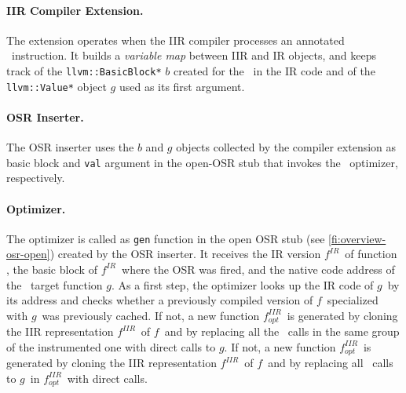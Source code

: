 \begin{enumerate}[noitemsep]
\begin{enumerate}
\paragraph{IIR Compiler Extension.}
The extension operates when the IIR compiler processes an annotated \feval\ instruction. It builds a {\em variable map} between IIR and IR objects, and keeps track of the {\tt llvm::BasicBlock*} $b$ created for the \feval\  in the IR code and of the {\tt llvm::Value*} object $g$ used as its first argument. 

\paragraph{OSR Inserter.}
The OSR inserter uses the $b$ and $g$ objects collected by the compiler extension as basic block and {\tt val} argument in the open-OSR stub that invokes the \feval\ optimizer, respectively.
\fi


\newcommand{\fBase}{$f$}
\newcommand{\fOpt}{$f_{opt}$}
\newcommand{\fIIR}{$f^{IIR}$}
\newcommand{\fIR}{$f^{IR}$}
\newcommand{\fOptIIR}{$f^{IIR}_{opt}$}
\newcommand{\fOptIR}{$f^{IR}_{opt}$}
\newcommand{\gTarget}{$g$}

\paragraph{Optimizer.}
The optimizer is called as {\tt gen} function in the open OSR stub (see \myfigure\ref{fi:overview-osr-open}) created by the OSR inserter. It receives the IR version \fIR\ of function \fbase, the basic block of \fIR\ where the OSR was fired, and the native code address of the \feval\ target function \gTarget. As a first step, the optimizer looks up the IR code of \gTarget\ by its address and checks whether a previously compiled version of \fBase\ specialized with \gTarget\ was previously cached.
\ifdefined \fullver
If not, a new function \fOptIIR\ is generated by cloning the IIR representation \fIIR\ of \fBase\ and by replacing all the \feval\ calls in the same group of the instrumented one with direct calls to \gTarget.
\else
If not, a new function \fOptIIR\ is generated by cloning the IIR representation \fIIR\ of \fBase\ and by replacing all \feval\ calls to \gTarget\ in \fOptIIR\ with direct calls.
\fi


\end{enumerate}
\end{enumerate}
